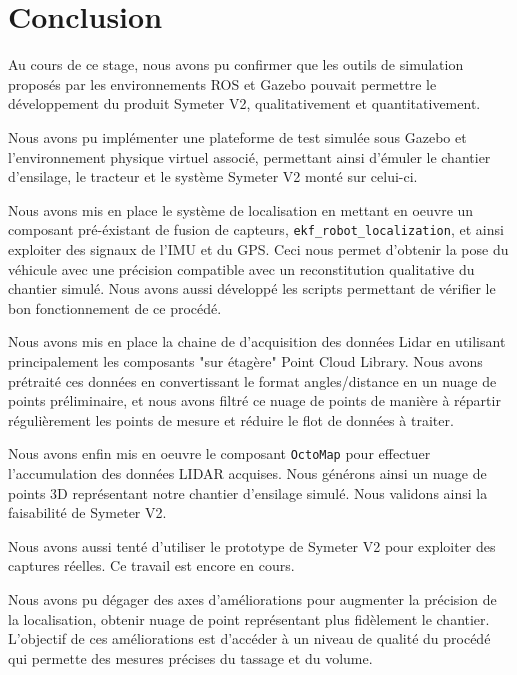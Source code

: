 \documentclass[12pt,a4paper]{report}
\begin{document}


\chapter{Conclusion}

Au cours de ce stage, nous avons pu confirmer que les outils de simulation proposés par les environnements  ROS et Gazebo pouvait permettre le développement du produit Symeter V2, qualitativement et quantitativement.

\para Nous avons pu implémenter une plateforme de test simulée sous Gazebo et l'environnement physique virtuel associé, permettant ainsi d'émuler le chantier d'ensilage, le tracteur et le système Symeter V2 monté sur celui-ci.

\para Nous avons mis en place le système de localisation en mettant en oeuvre un composant pré-éxistant de fusion de capteurs, \verb|ekf_robot_localization|, et ainsi exploiter des signaux de l'IMU et du GPS. Ceci nous permet d'obtenir la pose du véhicule avec une précision compatible avec un reconstitution qualitative du chantier simulé. Nous avons aussi développé les scripts permettant de vérifier le bon fonctionnement de ce procédé.

\para Nous avons mis en place la chaine de d'acquisition des données Lidar en utilisant principalement les composants "sur étagère" Point Cloud Library. Nous avons prétraité ces données en convertissant le format angles/distance en un nuage de points préliminaire, et nous avons filtré ce nuage de points de manière à répartir régulièrement les points de mesure et réduire le flot de données à traiter.

\para Nous avons enfin mis en oeuvre le composant \verb|OctoMap| pour effectuer l'accumulation des données LIDAR acquises. Nous générons ainsi un nuage de points 3D représentant notre chantier d'ensilage simulé. Nous validons ainsi la faisabilité de Symeter V2.

\para Nous avons aussi tenté d'utiliser le prototype de Symeter V2 pour exploiter des captures réelles. Ce travail est encore en cours.

\para Nous avons pu dégager des axes d'améliorations pour augmenter la précision de la localisation, obtenir nuage de point représentant plus fidèlement le chantier. L'objectif de ces améliorations est d'accéder à un niveau de qualité du procédé qui permette des mesures précises du tassage et du volume.
\end{document}
